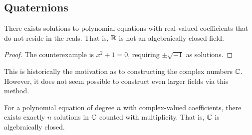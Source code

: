 \subsection*{Quaternions}

\begin{lemma}
    There exists solutions to polynomial equations with real-valued coefficients
    that do not reside in the reals.
    That is, \(\mathbb{R}\) is not an algebraically closed field.
\end{lemma}
\begin{proof}
    The counterexample is \(x^2 + 1 = 0\),
    requiring \(\pm\sqrt{-1}\) as solutions.
\end{proof}
\begin{remark}
    This is historically the motivation
    as to constructing the complex numbers \(\mathbb{C}\).
    However, it does not seem possible to construct
    even larger fields via this method.
\end{remark}
\begin{theorem}\label{thm:fta}
    For a polynomial equation of degree \(n\) with complex-valued coefficients,
    there exists exactly \(n\) solutions in \(\mathbb{C}\) counted with multiplicity.
    That is, \(\mathbb{C}\) is algebraically closed.
\end{theorem}

